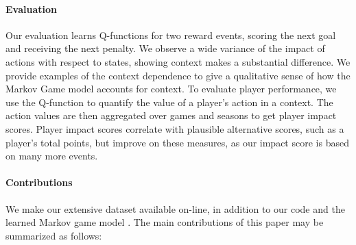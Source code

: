 \documentclass[]{article}
\begin{document}
\paragraph{Evaluation} Our evaluation learns Q-functions for two reward events, scoring the next goal and receiving the next penalty. We observe a wide variance of the impact of actions with respect to states, showing context makes a substantial difference. We provide examples of the context dependence to give a qualitative sense of how the Markov Game model accounts for context. %
To evaluate player performance, we use the Q-function to quantify the value of a player's action in a context. The action values are then aggregated over games and seasons to get player impact scores. Player impact scores correlate with plausible alternative scores, such as a player's total points, but improve on these measures, as our impact score is based on many more events.






\paragraph{Contributions}
We make our extensive dataset available on-line, in addition to our code and the learned Markov game model \citep{bib:sports-site}.
The main contributions of this paper may be summarized as follows:
\end{document}
